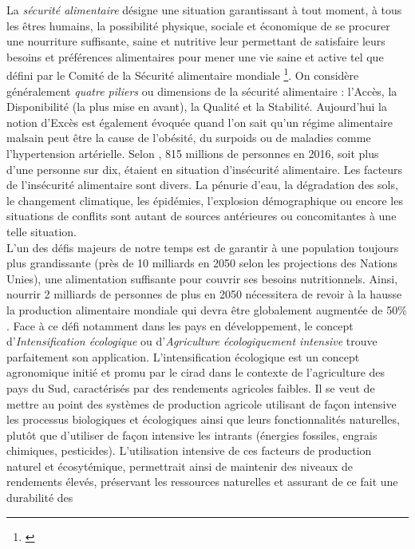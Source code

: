 La \emph{sécurité alimentaire} désigne \og une situation garantissant à tout moment, à tous les êtres humains, la possibilité physique, sociale et économique 
de se procurer une nourriture suffisante, saine et nutritive leur permettant de satisfaire leurs besoins et préférences alimentaires pour mener une vie saine et active \fg{} 
tel que défini par le Comité de la Sécurité alimentaire mondiale \footnote{\citep{ComitedelaSecuriteAlimentaireMondiale2012}}. On considère généralement \emph {quatre piliers} ou dimensions de la sécurité alimentaire : l'Accès, la Disponibilité 
(la plus mise en avant), la Qualité et la Stabilité. Aujourd'hui la notion d'Excès est également évoquée quand l'on sait qu'un régime alimentaire malsain peut être la cause de 
l'obésité, du surpoids ou de maladies comme l'hypertension artérielle. Selon \citep{FAO2017}, 815 millions de personnes en 2016, soit plus d'une personne sur dix, étaient en situation 
d'insécurité alimentaire. Les facteurs de l'insécurité alimentaire sont divers. La pénurie d'eau, la dégradation des sols, le changement climatique, les épidémies, 
l'explosion démographique ou encore les situations de conflits sont autant de sources antérieures ou concomitantes à une telle situation. \\L'un des défis majeurs de notre temps est de garantir à une 
population toujours plus grandissante (près de 10 milliards en 2050 selon les projections des Nations Unies), une alimentation suffisante pour couvrir ses besoins nutritionnels. 
Ainsi, nourrir 2 milliards de personnes de plus en 2050 nécessitera de revoir à la hausse la production alimentaire mondiale qui devra être globalement augmentée de 50\% . Face à ce défi notamment dans les pays en développement, le concept \og d'\emph{Intensification écologique} ou d'\emph{Agriculture écologiquement intensive} \fg{} trouve 
parfaitement son application. L'intensification écologique est un concept agronomique initié et promu par le \acrshort{cirad} dans le contexte de l'agriculture des pays du Sud, caractérisés par des 
rendements agricoles faibles. Il se veut de mettre au point des systèmes de production agricole utilisant de façon intensive les processus biologiques et écologiques ainsi que leurs 
fonctionnalités naturelles, plutôt que d'utiliser de façon intensive les intrants (énergies fossiles, engrais chimiques, pesticides). L'utilisation intensive de ces facteurs de 
production naturel et écosytémique, permettrait ainsi de maintenir des niveaux de rendements élevés, préservant les ressources naturelles et assurant de ce fait une durabilité des
